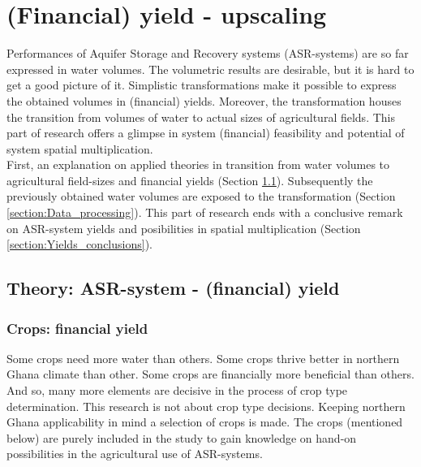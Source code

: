 \chapter{(Financial) yield - upscaling}
Performances of Aquifer Storage and Recovery systems (ASR-systems) are so far expressed in water volumes. The volumetric results are desirable, but it is hard to get a good picture of it. Simplistic transformations make it possible to express the obtained volumes in (financial) yields. Moreover, the transformation houses the transition from volumes of water to actual sizes of agricultural fields. This part of research offers a glimpse in system (financial) feasibility and potential of system spatial multiplication. \\

First, an explanation on applied theories in transition from water volumes to agricultural field-sizes and financial yields (Section \ref{section:Theory_yields}). Subsequently the previously obtained water volumes are exposed to the transformation (Section \ref{section:Data_processing}). This part of research ends with a conclusive remark on ASR-system yields and posibilities in spatial multiplication (Section \ref{section:Yields_conclusions}). 

\section{Theory: ASR-system - (financial) yield}
\label{section:Theory_yields}

\subsection{Crops: financial yield}
Some crops need more water than others. Some crops thrive better in northern Ghana climate than other. Some crops are financially more beneficial than others. And so, many more elements are decisive in the process of crop type determination. This research is not about crop type decisions. Keeping northern Ghana applicability in mind a selection of crops is made. The crops (mentioned below) are purely included in the study to gain knowledge on hand-on possibilities in the agricultural use of ASR-systems. \\

